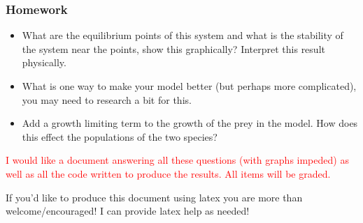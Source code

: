\documentclass[serif]{beamer}
\begin{document}
\begin{frame}
\frametitle{Homework} 

\begin{itemize}
\item What are the equilibrium points of this system and what is the stability of the system near the points, show this graphically? Interpret this result physically. 
\item What is one way to make your model better (but perhaps more complicated), you may need to research a bit for this. 
\item Add a growth limiting term to the growth of the prey in the model. How does this effect the populations of the two species? 
\end{itemize}


\textcolor{red}{I would like a document answering all these questions (with graphs impeded) as well as all the code written to produce the results. All items will be graded. }

If you'd like to produce this document using latex you are more than welcome/encouraged! I can provide latex help as needed! 
\end{frame}

\end{document}
